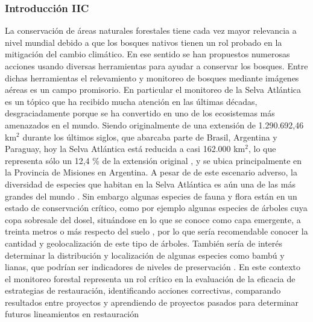 \subsubsection{Introducción IIC}
La conservación de áreas naturales forestales tiene cada vez mayor relevancia a nivel mundial debido a que los bosques nativos tienen un rol probado en la mitigación del cambio climático. En ese sentido se han propuestos numerosas acciones usando diversas herramientas para ayudar a conservar los bosques. Entre dichas herramientas el relevamiento y monitoreo de bosques mediante imágenes aéreas es un campo promisorio. En particular el monitoreo de la Selva Atlántica es un tópico que ha recibido mucha atención en las últimas décadas, desgraciadamente porque se ha convertido en uno de los ecosistemas más amenazados en el mundo. Siendo originalmente de una extensión de 1.290.692,46 km$^2$ durante los últimos siglos, que abarcaba parte de Brasil, Argentina y Paraguay, hoy la Selva Atlántica está reducida a casi 162.000 km$^2$, lo que representa sólo un 12,4 \% de la extensión original \cite{de_lima_erosion_2020}, y se ubica principalmente en la Provincia de Misiones en Argentina. A pesar de de este escenario adverso, la diversidad de especies que habitan en la Selva Atlántica es aún una de las más grandes del mundo \cite{lima_how_2015}. Sin embargo algunas especies de fauna y flora están en un estado de conservación crítico, como por ejemplo algunas especies de árboles cuya copa sobresale del dosel, situándose en lo que se conoce como capa emergente, a treinta metros o más respecto del suelo \cite{noauthor_rainforest_2015}, por lo que sería recomendable conocer la cantidad y geolocalización de este tipo de árboles. También sería de interés determinar la distribución y localización de algunas especies como bambú y lianas, que podrían ser indicadores de niveles de preservación \cite{bedrij_selective_2022}. En este contexto el monitoreo forestal representa un rol crítico en la evaluación de la eficacia de estrategias de restauración, identificando acciones correctivas, comparando resultados entre proyectos y aprendiendo de proyectos pasados para determinar futuros lineamientos en restauración \cite{viani_protocol_2017}
